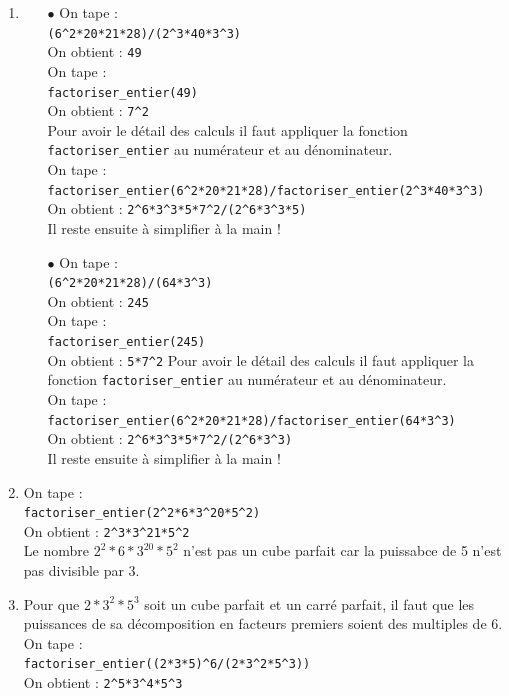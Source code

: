 \documentclass[a4paper,11pt]{book}
\begin{document}
\begin{enumerate}
\item
\begin{itemize}
\item[$\bullet$]
On tape :\\
{\tt (6\verb|^|2*20*21*28)/(2\verb|^|3*40*3\verb|^|3)}\\
On obtient : {\tt 49}\\
On tape :\\
{\tt factoriser\_entier(49)}\\
On obtient : {\tt 7\verb|^|2}\\
Pour avoir le d\'etail des calculs il faut appliquer la fonction {\tt factoriser\_entier}
au num\'erateur et au d\'enominateur.\\
On tape :\\
{\tt factoriser\_entier(6\verb|^|2*20*21*28)/factoriser\_entier(2\verb|^|3*40*3\verb|^|3)}\\
On obtient : {\tt 2\verb|^|6*3\verb|^|3*5*7\verb|^|2/(2\verb|^|6*3\verb|^|3*5)}\\
Il reste ensuite \`a simplifier \`a la main !
\item[$\bullet$]
On tape :\\
{\tt (6\verb|^|2*20*21*28)/(64*3\verb|^|3)}\\
On obtient : {\tt 245}\\
On tape :\\
{\tt factoriser\_entier(245)}\\
On obtient : {\tt 5*7\verb|^|2}
Pour avoir le d\'etail des calculs il faut appliquer la fonction {\tt factoriser\_entier}
au num\'erateur et au d\'enominateur.\\
On tape :\\
{\tt factoriser\_entier(6\verb|^|2*20*21*28)/factoriser\_entier(64*3\verb|^|3)}\\
On obtient : {\tt 2\verb|^|6*3\verb|^|3*5*7\verb|^|2/(2\verb|^|6*3\verb|^|3)}\\
Il reste ensuite \`a simplifier \`a la main !
\end{itemize}
\item
On tape :\\
{\tt factoriser\_entier(2\verb|^|2*6*3\verb|^|20*5\verb|^|2)}\\
On obtient : {\tt 2\verb|^|3*3\verb|^|21*5\verb|^|2}\\
Le nombre $2^2*6*3^{20}*5^2$ n'est pas un cube parfait car la puissabce de 5 n'est pas divisible par 3.
\item
Pour que $2*3^2*5^3$ soit un cube parfait et un carr\'e parfait, il faut que les
puissances de sa d\'ecomposition en facteurs premiers soient des multiples de 6.
On tape :\\
{\tt factoriser\_entier((2*3*5)\verb|^|6/(2*3\verb|^|2*5\verb|^|3))}\\
On obtient : {\tt 2\verb|^|5*3\verb|^|4*5\verb|^|3}
\end{enumerate}
\end{document}
